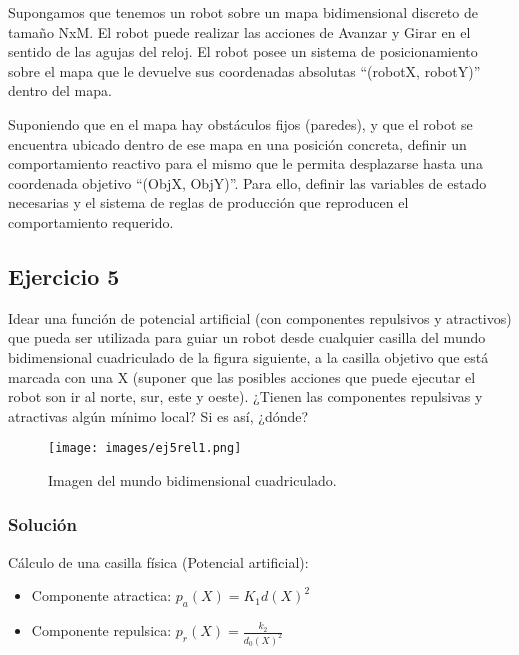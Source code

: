 Supongamos que tenemos un robot sobre un mapa bidimensional discreto de tamaño NxM. El 
robot puede realizar las acciones de Avanzar y Girar en el sentido de las agujas del reloj. El 
robot posee un sistema de posicionamiento sobre el mapa que le devuelve sus coordenadas 
absolutas “(robotX, robotY)” dentro del mapa. 

Suponiendo que en el mapa hay obstáculos fijos (paredes), y que el robot se encuentra ubicado 
dentro de ese mapa en una posición concreta, definir un comportamiento reactivo para el mismo 
que le permita desplazarse hasta una coordenada objetivo “(ObjX, ObjY)”. Para ello, definir las 
variables de estado necesarias y el sistema de reglas de producción que reproducen el 
comportamiento requerido.




\subsection*{Ejercicio 5}

Idear una función de potencial artificial (con componentes repulsivos y atractivos) que pueda 
ser utilizada para guiar un robot desde cualquier casilla del mundo bidimensional cuadriculado 
de la figura siguiente, a la casilla objetivo que está marcada con una X (suponer que las posibles 
acciones que puede ejecutar el robot son ir al norte, sur, este y oeste). ¿Tienen las componentes 
repulsivas y atractivas algún mínimo local? Si es así, ¿dónde?

\begin{figure}[H]
    \centering
    \texttt{[image: images/ej5rel1.png]}
    \caption{Imagen del mundo bidimensional cuadriculado.}
    \label{fig:mundo}
\end{figure}

\subsubsection*{Solución}

Cálculo de una casilla física (Potencial artificial): 

\begin{itemize}
    \item Componente atractica:
    $p_a(X) = K_1d(X)^2$
    \item Componente repulsica: 
    $p_r(X) = \frac{k_2}{d_0(X)^2}$
\end{itemize}

